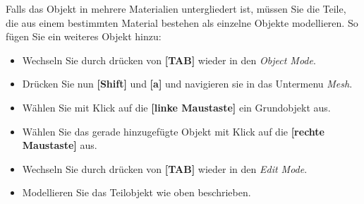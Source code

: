 \documentclass[10pt,a5paper,twoside,titlepage]{scrartcl}
\begin{document}
	Falls das Objekt in mehrere Materialien untergliedert ist, müssen Sie die Teile, die aus einem bestimmten Material bestehen als einzelne Objekte modellieren. So fügen Sie ein weiteres Objekt hinzu:
	\begin{itemize}
	\item Wechseln Sie durch drücken von \textbf{[TAB]} wieder in den \emph{Object Mode}.
	\item Drücken Sie nun \textbf{[Shift]} und \textbf{[a]} und navigieren sie in das Untermenu \emph{Mesh}.
	\item Wählen Sie mit Klick auf die \textbf{[linke Maustaste]} ein Grundobjekt aus.
	\item Wählen Sie das gerade hinzugefügte Objekt mit Klick auf die  \textbf{[rechte Maustaste]} aus.
	\item Wechseln Sie durch drücken von \textbf{[TAB]} wieder in den \emph{Edit Mode}.
	\item Modellieren Sie das Teilobjekt wie oben beschrieben.
	\end{itemize}
	
\end{document}
